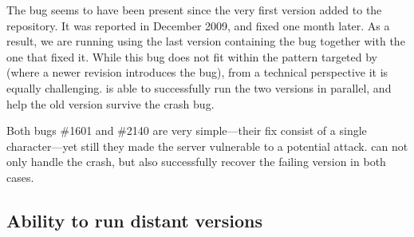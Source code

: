 The bug seems to have been present since the very first version
added to the repository.  It was reported in December 2009, and
fixed one month later.  As a result, we are running \mx using the last
version containing the bug together with the one that fixed it.  While
this bug does not fit within the pattern targeted by \mx (where a
newer revision introduces the bug), from a technical perspective it is
equally challenging.  \mx is able to successfully run the two versions
in parallel, and help the old version survive the crash bug.





Both \lighttpd bugs \#1601 and \#2140 are very simple---their fix consist of a
single character---yet still they made the \lighttpd server vulnerable to a
potential attack. \mx can not only handle the crash, but also successfully
recover the failing version in both cases.

\subsection{Ability to run distant versions}
\label{sec:bounds}


